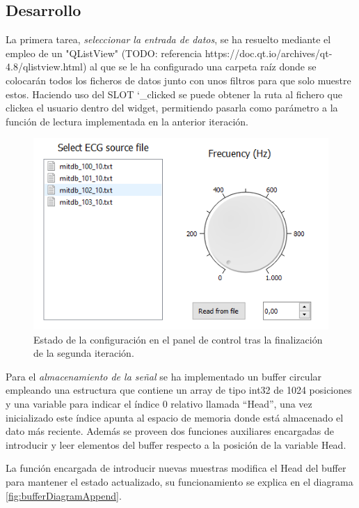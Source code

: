     \subsection{Desarrollo}
        
        La primera tarea, \textit{seleccionar la entrada de datos}, se ha resuelto mediante el empleo de un "QListView"  (TODO:  referencia https://doc.qt.io/archives/qt-4.8/qlistview.html) al que se le ha configurado una carpeta raíz donde se colocarán todos los ficheros de datos junto con unos filtros para que solo muestre estos. Haciendo uso del SLOT \char`_clicked se puede obtener la ruta al fichero que clickea el usuario dentro del widget, permitiendo pasarla como parámetro a la función de lectura implementada en la anterior iteración. 
        
        \begin{figure}[H] 
                \centering
                        \includegraphics[width = 0.8 \linewidth]{figuras/fileView.png}
                \caption{Estado de la configuración en el panel de control tras la finalización de la segunda iteración.}
                \label{fig:fileView}
        \end{figure}
        
        Para el \textit{almacenamiento de la señal} se ha implementado un buffer circular empleando una estructura que contiene un array de tipo int32 de 1024 posiciones y una variable para indicar el índice 0 relativo llamada “Head”, una vez inicializado este índice apunta al espacio de memoria donde está almacenado el dato más reciente. Además se proveen dos funciones auxiliares encargadas de introducir y leer elementos del buffer respecto a la posición de la variable Head. 
        
        La función encargada de introducir nuevas muestras modifica el Head del buffer para mantener el estado actualizado, su funcionamiento se explica en el diagrama \ref{fig:bufferDiagramAppend}. 
    
